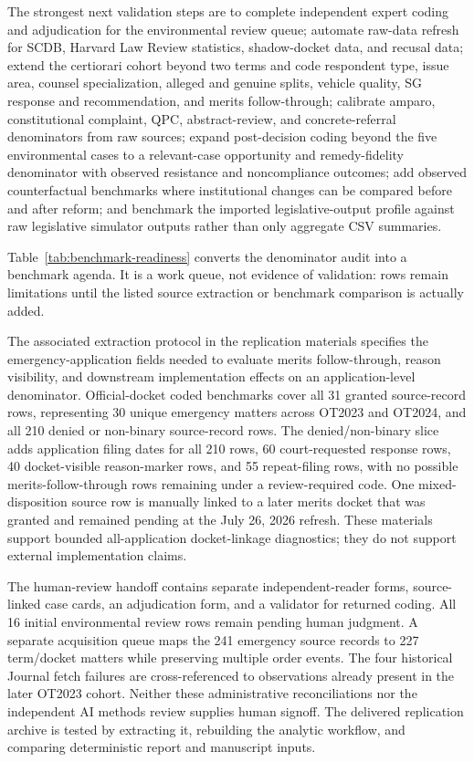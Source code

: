 \documentclass[
    journal=jlc,
    manuscript=research-article,
    year=2026,
  ]{cup-journal}
\begin{document}
The strongest next validation steps are to complete independent expert coding and adjudication for the environmental review queue; automate raw-data refresh for SCDB, Harvard Law Review statistics, shadow-docket data, and recusal data; extend the certiorari cohort beyond two terms and code respondent type, issue area, counsel specialization, alleged and genuine splits, vehicle quality, SG response and recommendation, and merits follow-through; calibrate amparo, constitutional complaint, QPC, abstract-review, and concrete-referral denominators from raw sources; expand post-decision coding beyond the five environmental cases to a relevant-case opportunity and remedy-fidelity denominator with observed resistance and noncompliance outcomes; add observed counterfactual benchmarks where institutional changes can be compared before and after reform; and benchmark the imported legislative-output profile against raw legislative simulator outputs rather than only aggregate CSV summaries.

Table~\ref{tab:benchmark-readiness} converts the denominator audit into a benchmark agenda. It is a work queue, not evidence of validation: rows remain limitations until the listed source extraction or benchmark comparison is actually added.



The associated extraction protocol in the replication materials specifies the emergency-application fields needed to evaluate merits follow-through, reason visibility, and downstream implementation effects on an application-level denominator. Official-docket coded benchmarks cover all 31 granted source-record rows, representing 30 unique emergency matters across OT2023 and OT2024, and all 210 denied or non-binary source-record rows. The denied/non-binary slice adds application filing dates for all 210 rows, 60 court-requested response rows, 40 docket-visible reason-marker rows, and 55 repeat-filing rows, with no possible merits-follow-through rows remaining under a review-required code. One mixed-disposition source row is manually linked to a later merits docket that was granted and remained pending at the July 26, 2026 refresh. These materials support bounded all-application docket-linkage diagnostics; they do not support external implementation claims.

The human-review handoff contains separate independent-reader forms, source-linked case cards, an adjudication form, and a validator for returned coding. All 16 initial environmental review rows remain pending human judgment. A separate acquisition queue maps the 241 emergency source records to 227 term/docket matters while preserving multiple order events. The four historical Journal fetch failures are cross-referenced to observations already present in the later OT2023 cohort. Neither these administrative reconciliations nor the independent AI methods review supplies human signoff. The delivered replication archive is tested by extracting it, rebuilding the analytic workflow, and comparing deterministic report and manuscript inputs.
\end{document}
